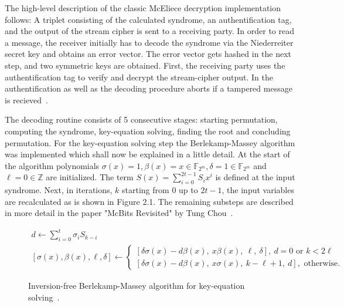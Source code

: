 \documentclass[11pt,
  oneside,openany,    %
]{scrreprt}
\begin{document}
The high-level description of the classic McEliece decryption implementation follows: 
A triplet consisting of the calculated syndrome, an authentification tag, and the output of the stream cipher is sent to a receiving party. In order to read a message, the receiver initially has to decode the syndrome via the Niederreiter secret key and obtains an error vector. The error vector gets hashed in the next step, and two symmetric keys are obtained. First, the receiving party uses the authentification tag to verify and decrypt the stream-cipher output. In the authentification as well as the decoding procedure aborts if a tampered message is recieved~\cite{McBits}.

The decoding routine consists of 5 consecutive stages: starting permutation, computing the syndrome, key-equation solving, finding the root and concluding permutation. For the key-equation solving step the Berlekamp-Massey algorithm was implemented which shall now be explained in a little detail. At the start of the algorithm polynomials $\sigma(x) = 1, \beta(x) = x \in \mathbb{F}_{2^{m}}, \delta = 1 \in \mathbb{F}_{2^{m}}$ and $\ell = 0 \in \mathbb{Z}$ are initialized. The term $S(x) = \sum_{i=0}^{2t-1} S_{i}x^{i}$ is defined at the input syndrome.
Next, in iterations, $k$ starting from $0$ up to $2t - 1$, the input variables are recalculated as is shown in Figure 2.1. The remaining substeps are described in more detail in the paper "McBits Revisited" by Tung Chou~\cite{McBits}.

\begin{figure}[H]
\begin{gather*}
d \leftarrow \sum_{i=0}^{t} \sigma_{i} S_{k-i} \\
{[\sigma(x), \beta(x), \ell, \delta] \leftarrow\left\{\begin{array}{l}
{[\delta \sigma(x)-d \beta(x), \ x \beta(x), \ \ell, \ \delta], \ d=0 \text { or } k<2 \ell} \\
{[\delta \sigma(x)-d \beta(x), \ x \sigma(x), \ k-\ell+1, \ d], \text { otherwise. }}
\end{array}\right.}
\end{gather*}
\caption{Inversion-free Berlekamp-Massey algorithm for key-equation solving~\cite{McBits}.}
\end{figure}
\end{document}
